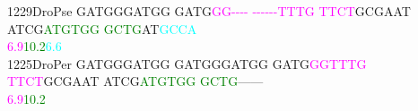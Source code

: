 \documentclass[11pt,twoside,reqno,a4paper]{article}
\begin{document}
{1229\hspace*{1\charwidth}DroPse	GATGGGATGG	GATG\textcolor{magenta}{G}\textcolor{magenta}{G}\textcolor{magenta}{-}\textcolor{magenta}{-}\textcolor{magenta}{-}\textcolor{magenta}{-}	\textcolor{magenta}{-}\textcolor{magenta}{-}\textcolor{magenta}{-}\textcolor{magenta}{-}\textcolor{magenta}{-}\textcolor{magenta}{-}\textcolor{magenta}{T}\textcolor{magenta}{T}\textcolor{magenta}{T}\textcolor{magenta}{G}	\textcolor{magenta}{T}\textcolor{magenta}{T}\textcolor{magenta}{C}\textcolor{magenta}{T}GCGAAT	ATCG\textcolor{green}{A}\textcolor{green}{T}\textcolor{green}{G}\textcolor{green}{T}\textcolor{green}{G}\textcolor{green}{G}	\textcolor{green}{G}\textcolor{green}{C}\textcolor{green}{T}\textcolor{green}{G}AT\textcolor{cyan}{G}\textcolor{cyan}{C}\textcolor{cyan}{C}\textcolor{cyan}{A}	\\
\hspace*{5\charwidth}\hspace*{7\charwidth}\hspace*{1\charwidth}\hspace*{14\charwidth}\textcolor{magenta}{6.9}\hspace*{1\charwidth}\hspace*{1\charwidth}\hspace*{1\charwidth}\hspace*{27\charwidth}\textcolor{green}{10.2}\hspace*{1\charwidth}\hspace*{8\charwidth}\textcolor{cyan}{6.6}\hspace*{1\charwidth}\\
1225\hspace*{1\charwidth}DroPer	GATGGGATGG	GATGGGATGG	GATG\textcolor{magenta}{G}\textcolor{magenta}{G}\textcolor{magenta}{T}\textcolor{magenta}{T}\textcolor{magenta}{T}\textcolor{magenta}{G}	\textcolor{magenta}{T}\textcolor{magenta}{T}\textcolor{magenta}{C}\textcolor{magenta}{T}GCGAAT	ATCG\textcolor{green}{A}\textcolor{green}{T}\textcolor{green}{G}\textcolor{green}{T}\textcolor{green}{G}\textcolor{green}{G}	\textcolor{green}{G}\textcolor{green}{C}\textcolor{green}{T}\textcolor{green}{G}------	\\
\hspace*{5\charwidth}\hspace*{7\charwidth}\hspace*{1\charwidth}\hspace*{1\charwidth}\hspace*{24\charwidth}\textcolor{magenta}{6.9}\hspace*{1\charwidth}\hspace*{1\charwidth}\hspace*{17\charwidth}\textcolor{green}{10.2}\hspace*{1\charwidth}\hspace*{1\charwidth}\\
}
\end{document}
